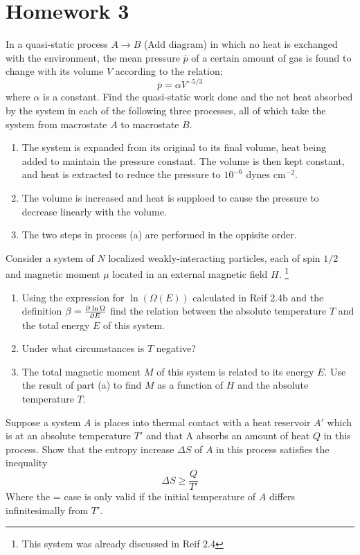 \documentclass{article}
\begin{document}
\section{Homework 3}
\begin{problem}[Reif 2.11]
    In a quasi-static process $A\rightarrow B$ (Add diagram) in which no heat is exchanged with the environment, the mean pressure $\overline{p}$ of a certain amount of gas is found to change with its volume $V$ according to the relation: $$\overline{p}=\alpha V^{-5/3}$$ where $\alpha$ is a constant. Find the quasi-static work done and the net heat absorbed by the system in each of the following three processes, all of which take the system from macrostate $A$ to macrostate $B$. 
    \begin{enumerate}[label=(\alph*)]
        \item The system is expanded from its original to its final volume, heat being added to maintain the pressure constant. The volume is then kept constant, and heat is extracted to reduce the pressure to $10^{-6}$ dynes cm$^{-2}$.
        \item The volume is increased and heat is supploed to cause the pressure to decrease linearly with the volume. 
        \item The two steps in process (a) are performed in the oppisite order. 
    \end{enumerate}
    \answerline
\end{problem}\newpage
\begin{problem}[Reif 3.2]
    Consider a system of $N$ localized weakly-interacting particles, each of spin $1/2$ and magnetic moment $\mu$ located in an external magnetic field $H$. \footnote{This system was already discussed in Reif 2.4}
    \begin{enumerate}[label=(\alph*)]
        \item Using the expression for $\ln(\Omega(E))$ calculated in Reif 2.4b and the definition $\beta=\pder{\ln\Omega}{E}$ find the relation between the absolute temperature $T$ and the total energy $E$ of this system. 
        \item Under what circumstances is $T$ negative?
        \item The total magnetic moment $M$ of this system is related to its energy $E$. Use the result of part (a) to find $M$ as a function of $H$ and the absolute temperature $T$.
    \end{enumerate}
    \answerline
\end{problem}\newpage
\begin{problem}[Reif 3.4]
    Suppose a system $A$ is places into thermal contact with a heat reservoir $A'$ which is at an absolute temperature $T'$ and that A absorbs an amount of heat $Q$ in this process. Show that the entropy increase $\Delta S$ of $A$ in this process satisfies the inequality $$\Delta S \geq \frac{Q}{T'}$$ Where the = case is only valid if the initial temperature of $A$ differs infinitesimally from $T'$. 
    \answerline
\end{problem}\newpage
\end{document}
